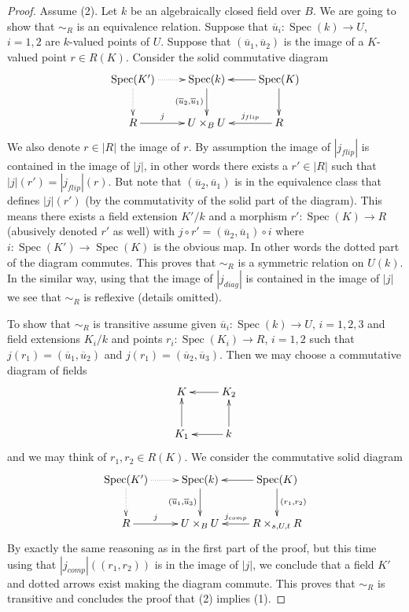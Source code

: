 \documentclass{stacks-project}
\theoremstyle{plain}
\theoremstyle{definition}
\theoremstyle{remark}
\numberwithin{equation}{subsection}
\def\Spec{\mathop{\mathrm{Spec}}}
\begin{document}
\begin{proof}
Assume (2). Let $k$ be an algebraically closed field over $B$.
We are going to show that $\sim_R$ is an equivalence relation.
Suppose that $\overline{u}_i : \Spec(k) \to U$, $i = 1, 2$
are $k$-valued points of $U$. Suppose that $(\overline{u}_1, \overline{u}_2)$
is the image of a $K$-valued point $r \in R(K)$. Consider the
solid commutative diagram
$$
\xymatrix{
\Spec(K') \ar@{..>}[r] \ar@{..>}[d]
&
\Spec(k) \ar[d]_{(\overline{u}_2, \overline{u}_1)} &
\Spec(K) \ar[d] \ar[l] \\
R \ar[r]^-j &
U \times_B U &
R \ar[l]_-{j_{flip}}
}
$$
We also denote $r \in |R|$ the image of $r$.
By assumption the image of $|j_{flip}|$ is contained in the image of
$|j|$, in other words there exists a $r' \in |R|$ such that
$|j|(r') = |j_{flip}|(r)$. But note that $(\overline{u}_2, \overline{u}_1)$
is in the equivalence class that defines $|j|(r')$ (by the commutativity
of the solid part of the diagram). This means there exists a field
extension $K'/k$ and a morphism $r' : \Spec(K) \to R$
(abusively denoted $r'$ as well) with
$j \circ r' = (\overline{u}_2, \overline{u}_1) \circ i$
where $i : \Spec(K') \to \Spec(K)$ is the obvious map.
In other words the dotted part of the diagram commutes.
This proves that $\sim_R$ is a symmetric relation on $U(k)$.
In the similar way, using that the image of $|j_{diag}|$ is contained
in the image of $|j|$ we see that $\sim_R$ is reflexive (details omitted).

\medskip\noindent
To show that $\sim_R$ is transitive assume given
$\overline{u}_i : \Spec(k) \to U$, $i = 1, 2, 3$
and field extensions $K_i/k$ and points
$r_i : \Spec(K_i) \to R$, $i = 1, 2$ such that
$j(r_1) = (\overline{u}_1, \overline{u}_2)$ and
$j(r_1) = (\overline{u}_2, \overline{u}_3)$. Then we may choose a
commutative diagram of fields
$$
\xymatrix{
K & K_2 \ar[l] \\
K_1 \ar[u] & k \ar[l] \ar[u]
}
$$
and we may think of $r_1, r_2 \in R(K)$. We consider the
commutative solid diagram
$$
\xymatrix{
\Spec(K') \ar@{..>}[r] \ar@{..>}[d]
&
\Spec(k) \ar[d]_{(\overline{u}_1, \overline{u}_3)} &
\Spec(K) \ar[d]^{(r_1, r_2)} \ar[l]
\\
R \ar[r]^-j &
U \times_B U &
R \times_{s, U, t} R \ar[l]_-{j_{comp}}
}
$$
By exactly the same reasoning as in the first part of the proof, but
this time using that $|j_{comp}|((r_1, r_2))$ is in the image of $|j|$,
we conclude that a field $K'$ and dotted arrows exist making the
diagram commute. This proves that $\sim_R$ is transitive and concludes
the proof that (2) implies (1).


\end{proof}
\end{document}
